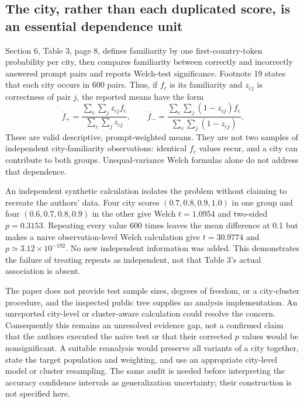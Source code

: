\documentclass[10pt]{article}
\begin{document}
\subsection*{The city, rather than each duplicated score, is an essential dependence unit}
Section 6, Table 3, page 8, defines familiarity by one first-country-token probability per city, then compares familiarity between correctly and incorrectly answered prompt pairs and reports Welch-test significance. Footnote 19 states that each city occurs in 600 pairs. Thus, if \(f_c\) is its familiarity and \(z_{cj}\) is correctness of pair \(j\), the reported means have the form \[\overline f_{+}=\frac{\sum_c\sum_j z_{cj} f_c}{\sum_c\sum_j z_{cj}},\qquad
 \overline f_{-}=\frac{\sum_c\sum_j (1-z_{cj}) f_c}{\sum_c\sum_j(1-z_{cj})}.\] These are valid descriptive, prompt-weighted means. They are not two samples of independent city-familiarity observations: identical \(f_c\) values recur, and a city can contribute to both groups. Unequal-variance Welch formulas alone do not address that dependence.\par
An independent synthetic calculation isolates the problem without claiming to recreate the authors’ data. Four city scores \((0.7,0.8,0.9,1.0)\) in one group and four \((0.6,0.7,0.8,0.9)\) in the other give Welch \(t=1.0954\) and two-sided \(p=0.3153\). Repeating every value 600 times leaves the mean difference at 0.1 but makes a naive observation-level Welch calculation give \(t=30.9774\) and \(p\simeq3.12\times10^{-192}\). No new independent information was added. This demonstrates the failure of treating repeats as independent, not that Table 3’s actual association is absent.\par
The paper does not provide test sample sizes, degrees of freedom, or a city-cluster procedure, and the inspected public tree supplies no analysis implementation. An unreported city-level or cluster-aware calculation could resolve the concern. Consequently this remains an unresolved evidence gap, not a confirmed claim that the authors executed the naive test or that their corrected \(p\) values would be nonsignificant. A suitable reanalysis would preserve all variants of a city together, state the target population and weighting, and use an appropriate city-level model or cluster resampling. The same audit is needed before interpreting the accuracy confidence intervals as generalization uncertainty; their construction is not specified here.\par
\end{document}
